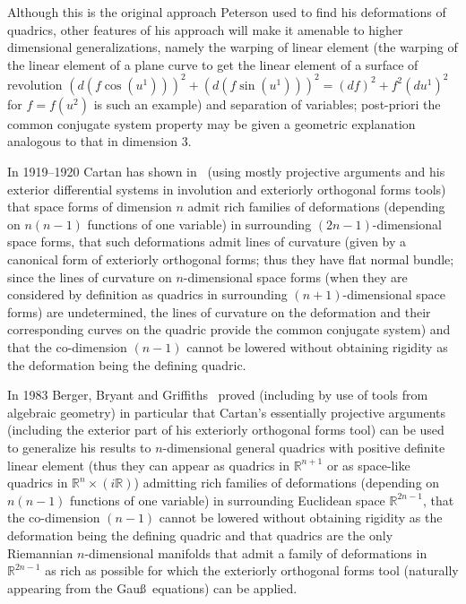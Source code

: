 Although this is the original approach Peterson used to f\/ind his
deformations of quadrics, other features of his approach will make
it amenable to higher dimensional generalizations, namely the
warping of linear element (the warping of the linear element of a
plane curve to get the linear element of a surface of revolution
$(d(f\cos(u^1)))^2+(d(f\sin(u^1)))^2=(df)^2+f^2(du^1)^2$ for
$f=f(u^2)$ is such an example) and separation of variables;
post-priori the common conjugate system property may be given a
geometric explanation analogous to that in dimension $3$.

In 1919--1920 Cartan has shown in~\cite{C} (using mostly projective
arguments and his exterior dif\/ferential systems in involution and
exteriorly orthogonal forms tools) that space forms of dimension
$n$ admit rich families of deformations (depending on $n(n-1)$
functions of one variable) in surrounding $(2n-1)$-dimensional
space forms, that such deformations admit lines of curvature
(given by a canonical form of exteriorly orthogonal forms; thus
they have f\/lat normal bundle; since the lines of curvature on
$n$-dimensional space forms (when they are considered by
def\/inition as quadrics in surrounding $(n+1)$-dimensional space
forms) are undetermined, the lines of curvature on the deformation
and their corresponding curves on the quadric provide the common
conjugate system) and that the co-dimension $(n-1)$ cannot be
lowered without obtaining rigidity as the deformation being the
def\/ining quadric.

In 1983 Berger, Bryant and Grif\/f\/iths~\cite{B} proved (including by
use of tools from algebraic geometry) in particular that Cartan's
essentially projective arguments (including the exterior part of
his exteriorly orthogonal forms tool) can be used to generalize
his results to $n$-dimensional general quadrics with positive
def\/inite linear element (thus they can appear as quadrics in
$\mathbb{R}^{n+1}$ or as space-like quadrics in
$\mathbb{R}^n\times(i\mathbb{R})$) admitting rich families of
deformations (depending on $n(n-1)$ functions of one variable) in
surrounding Euclidean space $\mathbb{R}^{2n-1}$, that the
co-dimension $(n-1)$ cannot be lowered without obtaining rigidity
as the deformation being the def\/ining quadric and that quadrics
are the only Riemannian $n$-dimensional manifolds that admit a
family of deformations in $\mathbb{R}^{2n-1}$ as rich as possible
for which the exteriorly orthogonal forms tool (naturally
appearing from the Gau\ss\ equations) can be applied.

